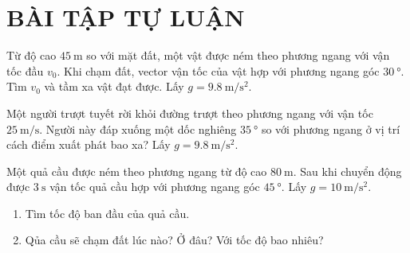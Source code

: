 \section{BÀI TẬP TỰ LUẬN}
\begin{ex}
	Từ độ cao $\SI{45}{\meter}$ so với mặt đất, một vật được ném theo phương ngang với vận tốc đầu $v_0$. Khi chạm đất, vector vận tốc của vật hợp với phương ngang góc $\SI{30}{\degree}$. Tìm $v_0$ và tầm xa vật đạt được. Lấy $g=\SI{9.8}{\meter/\second^2}$.
\end{ex}
\begin{ex}
	Một người trượt tuyết rời khỏi đường trượt theo phương ngang với vận tốc $\SI{25}{\meter/\second}$. Người này đáp xuống một dốc nghiêng $\SI{35}{\degree}$ so với phương ngang ở vị trí cách điểm xuất phát bao xa? Lấy $g=\SI{9.8}{\meter/\second^2}$.
\end{ex}
\begin{ex}
	Một quả cầu được ném theo phương ngang từ độ cao $\SI{80}{\meter}$. Sau khi chuyển động được $\SI{3}{\second}$ vận tốc quả cầu hợp với phương ngang góc $\SI{45}{\degree}$. Lấy $g=\SI{10}{\meter/\second^2}$.
	\begin{enumerate}[label=\alph*)]
		\item Tìm tốc độ ban đầu của quả cầu.
		\item Qủa cầu sẽ chạm đất lúc nào? Ở đâu? Với tốc độ bao nhiêu?
	\end{enumerate}	
\end{ex}

